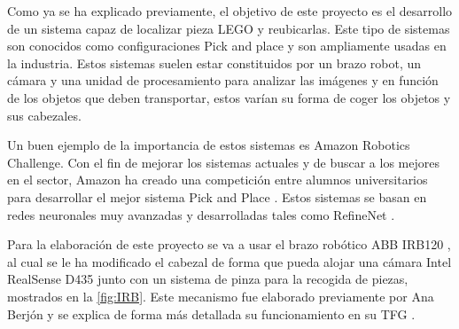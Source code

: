 Como ya se ha explicado previamente, el objetivo de este proyecto es el desarrollo de un sistema capaz de localizar pieza LEGO y reubicarlas. Este tipo de sistemas son conocidos como configuraciones Pick and place y son ampliamente usadas en la industria. Estos sistemas suelen estar constituidos por un brazo robot, un cámara y una unidad de procesamiento para analizar las imágenes y en función de los objetos que deben transportar, estos varían su forma de coger los objetos y sus cabezales.

Un buen ejemplo de la importancia de estos sistemas es Amazon Robotics Challenge. Con el fin de mejorar los sistemas actuales y de buscar a los mejores en el sector, Amazon ha creado una competición entre alumnos universitarios para desarrollar el mejor sistema Pick and Place \cite{amazon}. Estos sistemas se basan en redes neuronales muy avanzadas y desarrolladas tales como RefineNet \cite{amazon}.

Para la elaboración de este proyecto se va a usar el brazo robótico ABB IRB120 \cite{IRB120}, al cual se le ha modificado el cabezal de forma que pueda alojar una cámara Intel RealSense D435 \cite{IntelD435} junto con un sistema de pinza para la recogida de piezas, mostrados en la \autoref{fig:IRB}. Este mecanismo fue elaborado previamente por Ana Berjón y se explica de forma más detallada su funcionamiento en su TFG \cite{TFGAna}.

